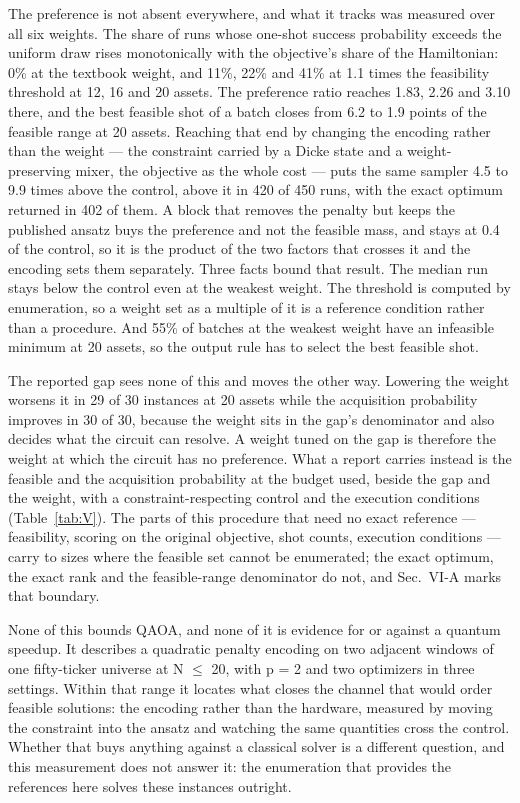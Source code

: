 \documentclass{ieeeaccess}
\begin{document}
The preference is not absent everywhere, and what it tracks was measured over all six weights. The share of runs whose one-shot success probability exceeds the uniform draw rises monotonically with the objective's share of the Hamiltonian: 0\% at the textbook weight, and 11\%, 22\% and 41\% at 1.1 times the feasibility threshold at 12, 16 and 20 assets. The preference ratio reaches 1.83, 2.26 and 3.10 there, and the best feasible shot of a batch closes from 6.2 to 1.9 points of the feasible range at 20 assets. Reaching that end by changing the encoding rather than the weight --- the constraint carried by a Dicke state and a weight-preserving mixer, the objective as the whole cost --- puts the same sampler 4.5 to 9.9 times above the control, above it in 420 of 450 runs, with the exact optimum returned in 402 of them. A block that removes the penalty but keeps the published ansatz buys the preference and not the feasible mass, and stays at 0.4 of the control, so it is the product of the two factors that crosses it and the encoding sets them separately. Three facts bound that result. The median run stays below the control even at the weakest weight. The threshold is computed by enumeration, so a weight set as a multiple of it is a reference condition rather than a procedure. And 55\% of batches at the weakest weight have an infeasible minimum at 20 assets, so the output rule has to select the best feasible shot.


The reported gap sees none of this and moves the other way. Lowering the weight worsens it in 29 of 30 instances at 20 assets while the acquisition probability improves in 30 of 30, because the weight sits in the gap's denominator and also decides what the circuit can resolve. A weight tuned on the gap is therefore the weight at which the circuit has no preference. What a report carries instead is the feasible and the acquisition probability at the budget used, beside the gap and the weight, with a constraint-respecting control and the execution conditions (Table~\ref{tab:V}). The parts of this procedure that need no exact reference --- feasibility, scoring on the original objective, shot counts, execution conditions --- carry to sizes where the feasible set cannot be enumerated; the exact optimum, the exact rank and the feasible-range denominator do not, and Sec.~VI-A marks that boundary.


None of this bounds QAOA, and none of it is evidence for or against a quantum speedup. It describes a quadratic penalty encoding on two adjacent windows of one fifty-ticker universe at N $\leq$ 20, with p = 2 and two optimizers in three settings. Within that range it locates what closes the channel that would order feasible solutions: the encoding rather than the hardware, measured by moving the constraint into the ansatz and watching the same quantities cross the control. Whether that buys anything against a classical solver is a different question, and this measurement does not answer it: the enumeration that provides the references here solves these instances outright.
\end{document}
